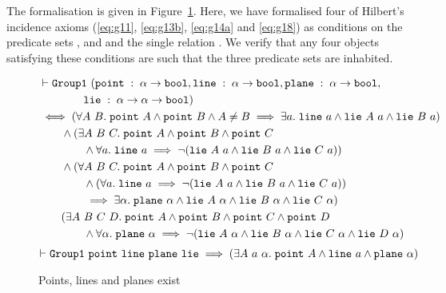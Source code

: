 The formalisation is given in Figure~\ref{fig:InhabitedTypes}. Here, we have formalised four of Hilbert's incidence axioms (\ref{eq:g11}, \ref{eq:g13b}, \ref{eq:g14a} and \ref{eq:g18}) as conditions on the predicate sets ,  and  and the single relation . We verify that any four objects satisfying these conditions are such that the three predicate sets are inhabited.

\begin{figure}
  \begin{align*}
    &\vdash\code{Group1}\ (\code{point}\;:\;\alpha\rightarrow\code{bool}, \code{line}\;:\;\alpha\rightarrow\code{bool},\code{plane}\;:\;\alpha\rightarrow\code{bool},\\
    &\qquad\qquad\code{lie}\;:\;\alpha\rightarrow\alpha\rightarrow\code{bool})\\
    &\iff (\forall A\ B.\; \code{point}\ A \wedge \code{point}\ B \wedge A \neq B \implies \exists a.\; \code{line}\ a \wedge \code{lie}\ A\ a \wedge \code{lie}\ B\ a)\\
    &\qquad\wedge (\exists A\ B\ C.\; \code{point}\ A \wedge \code{point}\ B \wedge \code{point}\ C\\
    &\qquad\qquad\wedge \forall a.\; \code{line}\ a \implies \neg(\code{lie}\ A\ a \wedge \code{lie}\ B\ a \wedge \code{lie}\ C\ a))\\
    &\qquad\wedge(\forall A\ B\ C.\; \code{point}\ A \wedge \code{point}\ B \wedge \code{point}\ C\\
    &\qquad\qquad\wedge (\forall a.\; \code{line}\ a \implies \neg(\code{lie}\ A\ a \wedge \code{lie}\ B\ a \wedge \code{lie}\ C\ a))\\
    &\qquad\qquad\implies\exists\alpha.\; \code{plane}\ \alpha \wedge \code{lie}\ A\ \alpha \wedge \code{lie}\ B\ \alpha \wedge \code{lie}\ C\ \alpha)\\
    &\qquad (\exists A\ B\ C\ D.\; \code{point}\ A \wedge \code{point}\ B \wedge \code{point}\ C \wedge \code{point}\ D\\
    &\qquad\qquad \wedge \forall\alpha.\; \code{plane}\ \alpha \implies \neg(\code{lie}\ A\ \alpha \wedge \code{lie}\ B\ \alpha \wedge \code{lie}\ C\ \alpha \wedge \code{lie}\ D\ \alpha)\\
  \end{align*}
  \begin{displaymath}
    \vdash \texttt{Group1}\ \texttt{point}\ \texttt{line}\ \texttt{plane}\ \texttt{lie} \implies (\exists A\ a\ \alpha.\; \texttt{point}\ A \wedge \texttt{line}\ a \wedge \texttt{plane}\ \alpha)
  \end{displaymath}
\caption{Points, lines and planes exist}
\label{fig:InhabitedTypes}
\end{figure}

